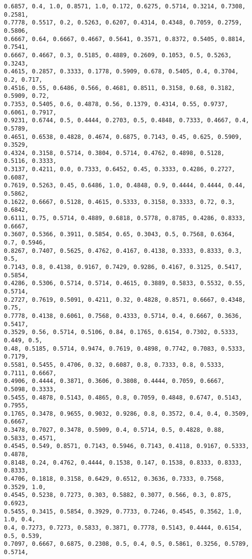 \documentclass[11pt]{article}
\begin{document}
\begin{Verbatim}[commandchars=\\\{\}]
0.6857, 0.4, 1.0, 0.8571, 1.0, 0.172, 0.6275, 0.5714, 0.3214, 0.7308, 0.2581,
0.7778, 0.5517, 0.2, 0.5263, 0.6207, 0.4314, 0.4348, 0.7059, 0.2759, 0.5806,
0.6667, 0.64, 0.6667, 0.4667, 0.5641, 0.3571, 0.8372, 0.5405, 0.8814, 0.7541,
0.6667, 0.4667, 0.3, 0.5185, 0.4889, 0.2609, 0.1053, 0.5, 0.5263, 0.3243,
0.4615, 0.2857, 0.3333, 0.1778, 0.5909, 0.678, 0.5405, 0.4, 0.3704, 0.2, 0.717,
0.4516, 0.55, 0.6486, 0.566, 0.4681, 0.8511, 0.3158, 0.68, 0.3182, 0.5909, 0.72,
0.7353, 0.5405, 0.6, 0.4878, 0.56, 0.1379, 0.4314, 0.55, 0.9737, 0.6061, 0.7917,
0.9231, 0.6744, 0.5, 0.4444, 0.2703, 0.5, 0.4848, 0.7333, 0.4667, 0.4, 0.5789,
0.4651, 0.6538, 0.4828, 0.4674, 0.6875, 0.7143, 0.45, 0.625, 0.5909, 0.3529,
0.4324, 0.3158, 0.5714, 0.3804, 0.5714, 0.4762, 0.4898, 0.5128, 0.5116, 0.3333,
0.3137, 0.4211, 0.0, 0.7333, 0.6452, 0.45, 0.3333, 0.4286, 0.2727, 0.6087,
0.7619, 0.5263, 0.45, 0.6486, 1.0, 0.4848, 0.9, 0.4444, 0.4444, 0.44, 0.5862,
0.1622, 0.6667, 0.5128, 0.4615, 0.5333, 0.3158, 0.3333, 0.72, 0.3, 0.6842,
0.6111, 0.75, 0.5714, 0.4889, 0.6818, 0.5778, 0.8785, 0.4286, 0.8333, 0.6667,
0.3607, 0.5366, 0.3911, 0.5854, 0.65, 0.3043, 0.5, 0.7568, 0.6364, 0.7, 0.5946,
0.8267, 0.7407, 0.5625, 0.4762, 0.4167, 0.4138, 0.3333, 0.8333, 0.3, 0.5,
0.7143, 0.8, 0.4138, 0.9167, 0.7429, 0.9286, 0.4167, 0.3125, 0.5417, 0.5854,
0.4286, 0.5306, 0.5714, 0.5714, 0.4615, 0.3889, 0.5833, 0.5532, 0.55, 0.5714,
0.2727, 0.7619, 0.5091, 0.4211, 0.32, 0.4828, 0.8571, 0.6667, 0.4348, 0.75,
0.7778, 0.4138, 0.6061, 0.7568, 0.4333, 0.5714, 0.4, 0.6667, 0.3636, 0.5417,
0.3529, 0.56, 0.5714, 0.5106, 0.84, 0.1765, 0.6154, 0.7302, 0.5333, 0.449, 0.5,
0.48, 0.5185, 0.5714, 0.9474, 0.7619, 0.4898, 0.7742, 0.7083, 0.5333, 0.7179,
0.5581, 0.5455, 0.4706, 0.32, 0.6087, 0.8, 0.7333, 0.8, 0.5333, 0.7111, 0.6667,
0.4906, 0.4444, 0.3871, 0.3606, 0.3808, 0.4444, 0.7059, 0.6667, 0.5098, 0.3333,
0.5455, 0.4878, 0.5143, 0.4865, 0.8, 0.7059, 0.4848, 0.6747, 0.5143, 0.7955,
0.1765, 0.3478, 0.9655, 0.9032, 0.9286, 0.8, 0.3572, 0.4, 0.4, 0.3509, 0.6667,
0.3478, 0.7027, 0.3478, 0.5909, 0.4, 0.5714, 0.5, 0.4828, 0.88, 0.5833, 0.4571,
0.4545, 0.549, 0.8571, 0.7143, 0.5946, 0.7143, 0.4118, 0.9167, 0.5333, 0.4878,
0.8148, 0.24, 0.4762, 0.4444, 0.1538, 0.147, 0.1538, 0.8333, 0.8333, 0.8333,
0.4706, 0.1818, 0.3158, 0.6429, 0.6512, 0.3636, 0.7333, 0.7568, 0.3529, 1.0,
0.4545, 0.5238, 0.7273, 0.303, 0.5882, 0.3077, 0.566, 0.3, 0.875, 0.6923,
0.5455, 0.3415, 0.5854, 0.3929, 0.7733, 0.7246, 0.4545, 0.3562, 1.0, 1.0, 0.4,
0.4, 0.7273, 0.7273, 0.5833, 0.3871, 0.7778, 0.5143, 0.4444, 0.6154, 0.5, 0.539,
0.7097, 0.6667, 0.6875, 0.2308, 0.5, 0.4, 0.5, 0.5861, 0.3256, 0.5789, 0.5714,

\end{Verbatim}
\end{document}
